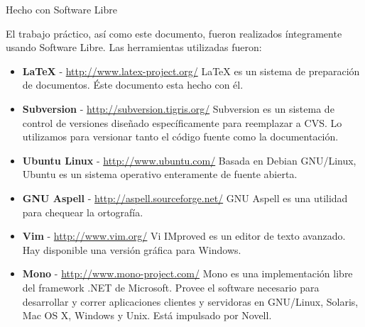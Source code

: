 %
% 
%

\thispagestyle{empty}

\begin{center}
\LARGE{Hecho con Software Libre}
\end{center}

\noindent

El trabajo práctico, así como este documento, fueron realizados íntegramente
usando Software Libre. Las herramientas utilizadas fueron:

\begin{flushleft}
\begin{itemize}

\item \textbf{\LaTeX} - \href{http://www.latex-project.org/}
  {http://www.latex-project.org/}
\linebreak\LaTeX{} es un sistema de preparación de documentos. Éste
  documento esta hecho con él.

\item \textbf{Subversion} - \href{http://subversion.tigris.org/}
  {http://subversion.tigris.org/}
\linebreak Subversion es un sistema de control de versiones diseñado
  específicamente para reemplazar a CVS. Lo utilizamos para versionar
  tanto el código fuente como la documentación.

\item \textbf{Ubuntu Linux} - \href{http://www.ubuntu.com/}
  {http://www.ubuntu.com/}
\linebreak Basada en Debian GNU/Linux, Ubuntu es un sistema operativo
enteramente de fuente abierta.

\item \textbf{GNU Aspell} - \href{http://aspell.sourceforge.net//}
  {http://aspell.sourceforge.net/}
\linebreak GNU Aspell es una utilidad para chequear la ortografía.

\item \textbf{Vim} - \href{http://www.vim.org/}
  {http://www.vim.org/}
\linebreak Vi IMproved es un editor de texto avanzado. Hay disponible una
versión gráfica para Windows.

\item \textbf{Mono} - \href{http://www.mono-project.com/}
  {http://www.mono-project.com/}
\linebreak Mono es una implementación libre del framework .NET de Microsoft.
Provee el software necesario para desarrollar y correr aplicaciones clientes y
servidoras en GNU/Linux, Solaris, Mac OS X, Windows y Unix. Está impulsado por
Novell.


\end{itemize}
\end{flushleft}
